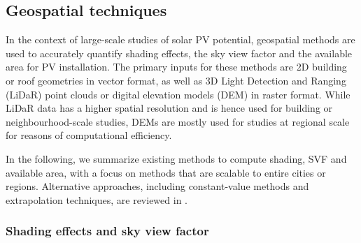 \subsection{Geospatial techniques}
\label{GIS_methods}

In the context of large-scale studies of solar PV potential, geospatial methods are used to accurately quantify shading effects, the sky view factor and the available area for PV installation. The primary inputs for these methods are 2D building or roof geometries in vector format, as well as 3D Light Detection and Ranging (LiDaR) point clouds or digital elevation models (DEM) in raster format. While LiDaR data has a higher spatial resolution and is hence used for building or neighbourhood-scale studies, DEMs are mostly used for studies at regional scale for reasons of computational efficiency. 

In the following, we summarize existing methods to compute shading, SVF and available area, with a focus on methods that are scalable to entire cities or regions.
Alternative approaches, including constant-value methods and extrapolation techniques, are reviewed in \cite{assouline_estimation_2017}.

\subsubsection{Shading effects and sky view factor}

